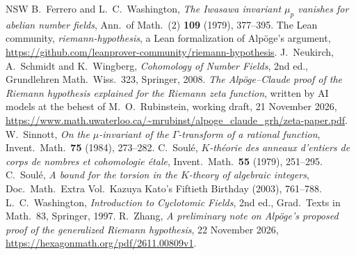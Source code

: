 \documentclass[reqno]{amsart}
\theoremstyle{definition}
\theoremstyle{plain}
\theoremstyle{remark}
\begin{document}
\begin{thebibliography}{NSW}
 B.~Ferrero and L.~C.~Washington, \emph{The Iwasawa invariant \(\mu_p\) vanishes for abelian number fields}, Ann.\ of Math.\ (2) \textbf{109} (1979), 377--395.
 The Lean community, \emph{riemann-hypothesis}, a Lean formalization of Alp\"oge's argument, \url{https://github.com/leanprover-community/riemann-hypothesis}.
 J.~Neukirch, A.~Schmidt and K.~Wingberg, \emph{Cohomology of Number Fields}, 2nd ed., Grundlehren Math.\ Wiss.\ 323, Springer, 2008.
 \emph{The Alp\"oge--Claude proof of the Riemann hypothesis explained for the Riemann zeta function}, written by AI models at the behest of M.~O.~Rubinstein, working draft, 21 November 2026, \url{https://www.math.uwaterloo.ca/~mrubinst/alpoge_claude_grh/zeta-paper.pdf}.
 W.~Sinnott, \emph{On the \(\mu\)-invariant of the \(\Gamma\)-transform of a rational function}, Invent.\ Math.\ \textbf{75} (1984), 273--282.
 C.~Soul\'e, \emph{\(K\)-th\'eorie des anneaux d'entiers de corps de nombres et cohomologie \'etale}, Invent.\ Math.\ \textbf{55} (1979), 251--295.
 C.~Soul\'e, \emph{A bound for the torsion in the \(K\)-theory of algebraic integers}, Doc.\ Math.\ Extra Vol.\ Kazuya Kato's Fiftieth Birthday (2003), 761--788.
 L.~C.~Washington, \emph{Introduction to Cyclotomic Fields}, 2nd ed., Grad.\ Texts in Math.\ 83, Springer, 1997.
 R.~Zhang, \emph{A preliminary note on Alp\"oge's proposed proof of the generalized Riemann hypothesis}, 22 November 2026, \url{https://hexagonmath.org/pdf/2611.00809v1}.
\end{thebibliography}
\end{document}
